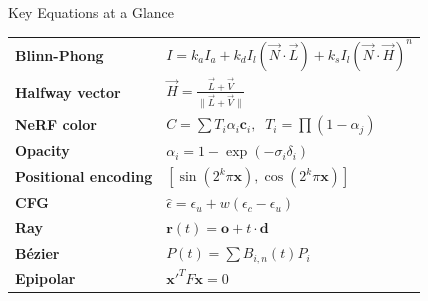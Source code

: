 \documentclass[11pt]{article}
\begin{document}
\begin{formulabox}{Key Equations at a Glance}
\begin{tabular}{>{\bfseries}p{2.5cm} p{10cm}}
Blinn-Phong & $I = k_a I_a + k_d I_l (\vec{N}\!\cdot\!\vec{L}) + k_s I_l (\vec{N}\!\cdot\!\vec{H})^n$ \\[0.6em]
Halfway vector & $\vec{H} = \frac{\vec{L} + \vec{V}}{\|\vec{L} + \vec{V}\|}$ \\[0.8em]
NeRF color & $C = \sum T_i \alpha_i \mathbf{c}_i, \;\; T_i = \prod(1-\alpha_j)$ \\[0.8em]
Opacity & $\alpha_i = 1 - \exp(-\sigma_i \delta_i)$ \\[0.6em]
Positional encoding & $[\sin(2^k \pi \mathbf{x}), \cos(2^k \pi \mathbf{x})]$ \\[0.6em]
CFG & $\hat{\epsilon} = \epsilon_u + w(\epsilon_c - \epsilon_u)$ \\[0.6em]
Ray & $\mathbf{r}(t) = \mathbf{o} + t \cdot \mathbf{d}$ \\[0.6em]
Bézier & $P(t) = \sum B_{i,n}(t) P_i$ \\[0.6em]
Epipolar & $\mathbf{x}'^T F \mathbf{x} = 0$
\end{tabular}
\end{formulabox}
\end{document}
